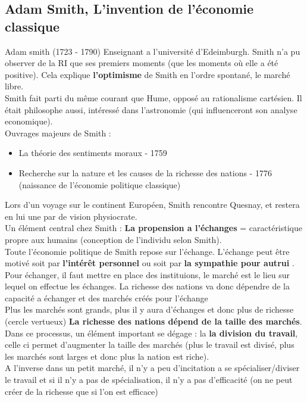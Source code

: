 \documentclass{article}
\begin{document}
\subsection{Adam Smith, L'invention de l'économie classique}
Adam smith (1723 - 1790) Enseignant a l'université d'Edeimburgh. Smith n'a pu observer de la RI que ses premiers moments (que les moments où elle a été positive). Cela explique \textbf{l'optimisme} de Smith en l'ordre spontané, le marché libre. \\
Smith fait parti du même courant que Hume, opposé au rationalisme cartésien. Il était philosophe aussi, intéressé dans l'astronomie (qui influenceront son analyse economique). \\
Ouvrages majeurs de Smith : 
\begin{itemize}
	\item La théorie des sentiments moraux - 1759
	\item Recherche sur la nature et les causes de la richesse des nations - 1776 (naissance de l'économie politique classique)
\end{itemize}
Lors d'un voyage sur le continent Européen, Smith rencontre Quesnay, et restera en lui une par de vision physiocrate. \\
Un élément central chez Smith : \textbf{La propension a l'échanges} = caractéristique propre aux humains (conception de l'individu selon Smith). \\
Toute l'économie politique de Smith repose sur l'échange. L'échange peut être motivé soit par \textbf{l'intérêt personnel} ou soit par \textbf{la sympathie pour autrui }. Pour échanger, il faut mettre en place des instituions, le marché est le lieu sur lequel on effectue les échanges. La richesse des nations va donc dépendre de la capacité a échanger et des marchés créés pour l'échange \\
Plus les marchés sont grands, plus il y aura d'échanges et donc plus de richesse (cercle vertueux) \textbf{La richesse des nations dépend de la taille des marchés}. \\
Dans ce processus, un élément important se dégage : la \textbf{la division du travail}, celle ci permet d'augmenter la taille des marchés (plus le travail est divisé, plus les marchés sont larges et donc plus la nation est riche). \\
A l'inverse dans un petit marché, il n'y a peu d'incitation a se spécialiser/diviser le travail et si il n'y a pas de spécialisation, il n'y a pas d'efficacité (on ne peut créer de la richesse que si l'on est efficace)\\
\end{document}
